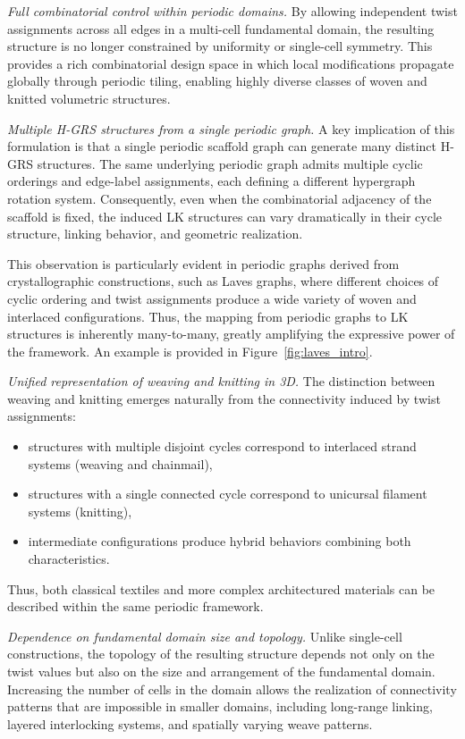 \documentclass[acmtog]{acmart}
\begin{document}
\textit{Full combinatorial control within periodic domains.}
By allowing independent twist assignments across all edges in a multi-cell fundamental domain, the resulting structure is no longer constrained by uniformity or single-cell symmetry. This provides a rich combinatorial design space in which local modifications propagate globally through periodic tiling, enabling highly diverse classes of woven and knitted volumetric structures.

\textit{Multiple H-GRS structures from a single periodic graph.}
A key implication of this formulation is that a single periodic scaffold graph can generate many distinct H-GRS structures. The same underlying periodic graph admits multiple cyclic orderings and edge-label assignments, each defining a different hypergraph rotation system. Consequently, even when the combinatorial adjacency of the scaffold is fixed, the induced LK structures can vary dramatically in their cycle structure, linking behavior, and geometric realization.

This observation is particularly evident in periodic graphs derived from crystallographic constructions, such as Laves graphs, where different choices of cyclic ordering and twist assignments produce a wide variety of woven and interlaced configurations.
Thus, the mapping from periodic graphs to LK structures is inherently many-to-many, greatly amplifying the expressive power of the framework. An example is provided in Figure~\ref{fig:laves_intro}.

\textit{Unified representation of weaving and knitting in 3D.}
The distinction between weaving and knitting emerges naturally from the connectivity induced by twist assignments:
\begin{itemize}
    \item structures with multiple disjoint cycles correspond to interlaced strand systems (weaving and chainmail),
    \item structures with a single connected cycle correspond to unicursal filament systems (knitting),
    \item intermediate configurations produce hybrid behaviors combining both characteristics.
\end{itemize}
Thus, both classical textiles and more complex architectured materials can be described within the same periodic framework.

\textit{Dependence on fundamental domain size and topology.}
Unlike single-cell constructions, the topology of the resulting structure depends not only on the twist values but also on the size and arrangement of the fundamental domain. Increasing the number of cells in the domain allows the realization of connectivity patterns that are impossible in smaller domains, including long-range linking, layered interlocking systems, and spatially varying weave patterns.
\end{document}
